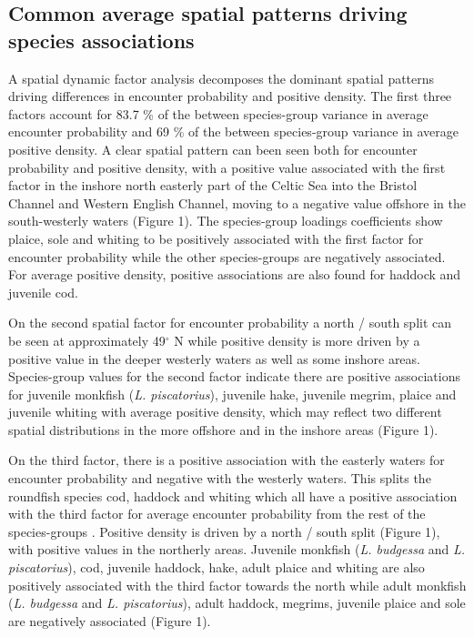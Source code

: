 \documentclass{nature}
\begin{document}
\subsection{Common average spatial patterns driving species associations} A
spatial dynamic factor analysis decomposes the dominant spatial patterns
driving differences in encounter probability and positive density. The first
three factors  account for 83.7 \% of the between
species-group variance in average encounter probability and 69 \% of the
between species-group variance in average positive density. A clear spatial
pattern can been seen both for encounter probability and positive density, with
a positive value associated with the first factor in the inshore north easterly
part of the Celtic Sea into the Bristol Channel and Western English Channel,
moving to a negative value offshore in the south-westerly waters (Figure 1).
The species-group loadings coefficients show plaice, sole and whiting to be
positively associated with the first factor for encounter probability while the
other species-groups are negatively associated. For average positive density,
positive associations are also found for haddock and juvenile cod.  

On the second spatial factor for encounter probability a north / south split
can be seen at approximately 49$^{\circ}$ N while positive density is more
driven by a positive value in the deeper westerly waters as well as some
inshore areas. Species-group values for the second factor indicate there are
positive associations for juvenile monkfish (\emph{L. piscatorius}), juvenile
hake, juvenile megrim, plaice and juvenile whiting with average positive
density, which may reflect two different spatial distributions in the more
offshore and in the inshore areas (Figure 1).

On the third factor, there is a positive association with the easterly waters
for encounter probability and negative with the westerly waters. This
 splits the
roundfish species cod, haddock and whiting which all have a positive
association with the third factor for average encounter probability from the
rest of the species-groups .
Positive density is driven by a north / south split (Figure 1), with positive
values in the northerly areas. Juvenile monkfish (\emph{L.  budgessa} and
\emph{L. piscatorius}), cod, juvenile haddock, hake, adult plaice and whiting
are also positively associated with the third factor towards the north while
adult monkfish (\emph{L. budgessa} and \emph{L.  piscatorius}), adult haddock,
megrims, juvenile plaice and sole are negatively associated  (Figure 1).
\end{document}
